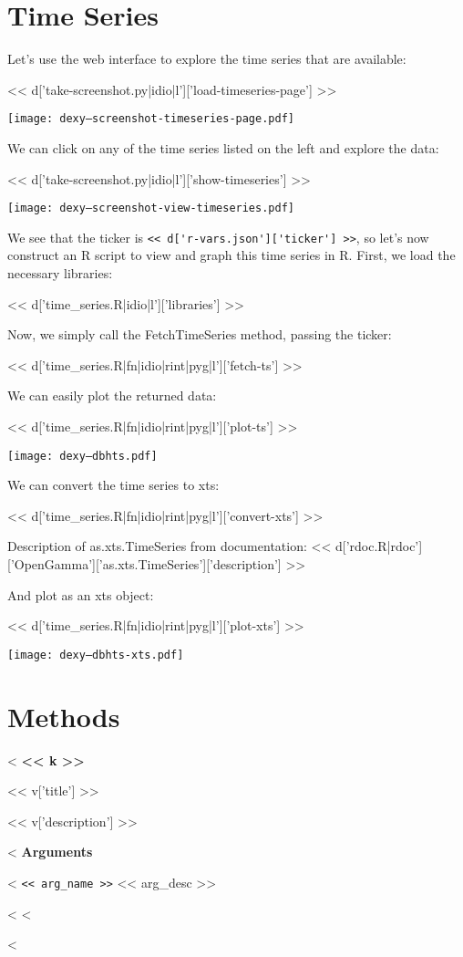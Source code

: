 \documentclass[a4paper]{amsart}
\begin{document}
\section{Time Series}

Let's use the web interface to explore the time series that are available:

<< d['take-screenshot.py|idio|l']['load-timeseries-page'] >>

\texttt{[image: dexy--screenshot-timeseries-page.pdf]}

We can click on any of the time series listed on the left and explore the data:

<< d['take-screenshot.py|idio|l']['show-timeseries'] >>

\texttt{[image: dexy--screenshot-view-timeseries.pdf]}

We see that the ticker is \verb|<< d['r-vars.json']['ticker'] >>|, so let's now construct an R script to view and graph this time series in R. First, we load the necessary libraries:

<< d['time_series.R|idio|l']['libraries'] >>

Now, we simply call the FetchTimeSeries method, passing the ticker:

<< d['time_series.R|fn|idio|rint|pyg|l']['fetch-ts'] >>

We can easily plot the returned data:

<< d['time_series.R|fn|idio|rint|pyg|l']['plot-ts'] >>

\texttt{[image: dexy--dbhts.pdf]}

We can convert the time series to xts:

<< d['time_series.R|fn|idio|rint|pyg|l']['convert-xts'] >>

Description of as.xts.TimeSeries from documentation: << d['rdoc.R|rdoc']['OpenGamma']['as.xts.TimeSeries']['description'] >>

And plot as an xts object:

<< d['time_series.R|fn|idio|rint|pyg|l']['plot-xts'] >>

\texttt{[image: dexy--dbhts-xts.pdf]}


\section{Methods}

<%
\vspace{1cm}
\large
\textbf{<< k >>}
\normalsize

<< v['title'] >>

<< v['description'] >>

<%
\vspace{0.5cm}
\textbf{Arguments}

\selectfont
<%
\verb|<< arg_name >>| << arg_desc >>

<%
\selectfont
<%

<%
\end{document}
